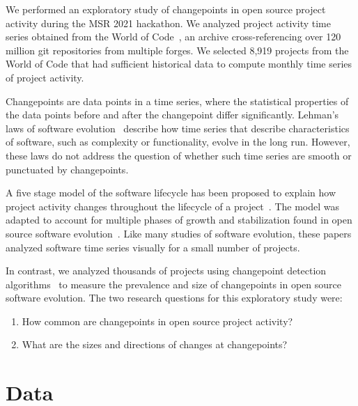 \documentclass[10pt,conference]{IEEEtran}
\begin{document}
We performed an exploratory study of changepoints in open source project activity during the MSR 2021 hackathon. We analyzed project activity time series obtained from the World of Code~\cite{ma2019world}, an archive cross-referencing over 120 million git repositories from multiple forges. We selected 8,919 projects from the World of Code that had sufficient historical data to compute monthly time series of project activity.

Changepoints are data points in a time series, where the statistical properties of the data points before and after the changepoint differ significantly. Lehman's laws of software evolution~\cite{lehman1996laws} describe how time series that describe characteristics of software, such as complexity or functionality, evolve in the long run. However, these laws do not address the question of whether such time series are smooth or punctuated by changepoints.

A five stage model of the software lifecycle has been proposed to explain how project activity changes throughout the lifecycle of a project~\cite{rajlich2000staged}. The model was adapted to account for multiple phases of growth and stabilization found in open source software evolution~\cite{capiluppi2007adapting}. Like many studies of software evolution, these papers analyzed software time series visually for a small number of projects.


In contrast, we analyzed thousands of projects using changepoint detection algorithms~\cite{van2020evaluation} to measure the prevalence and size of changepoints in open source software evolution. The two research questions for this exploratory study were:
\begin{enumerate}
    \item How common are changepoints in open source project activity?
    \item What are the sizes and directions of changes at changepoints?
\end{enumerate}

\section{Data}
\end{document}
